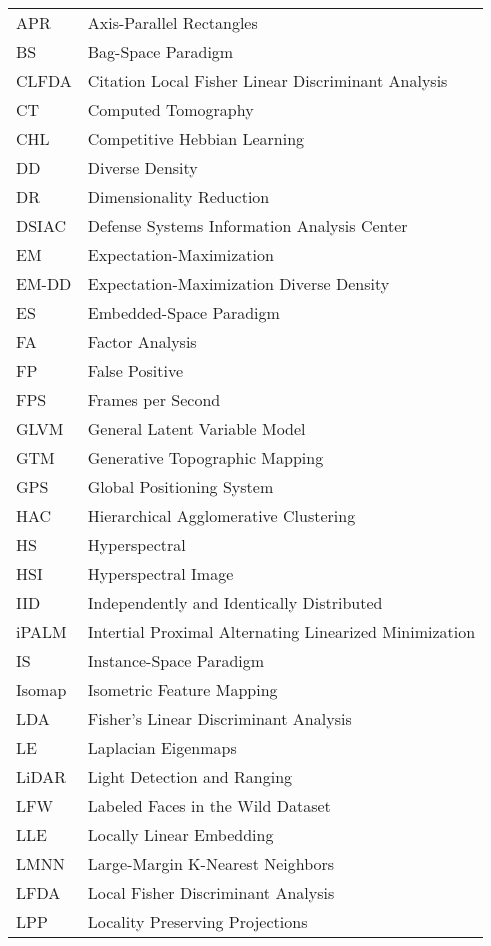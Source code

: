 \begin{longtable}{l p{5in}} %

APR & Axis-Parallel Rectangles\\
BS & Bag-Space Paradigm\\
CLFDA &  Citation Local Fisher Linear Discriminant Analysis\\
CT & Computed Tomography\\
CHL & Competitive Hebbian Learning\\
DD & Diverse Density\\
DR & Dimensionality Reduction\\
DSIAC & Defense Systems Information Analysis Center\\
EM & Expectation-Maximization\\
EM-DD & Expectation-Maximization Diverse Density\\
ES & Embedded-Space Paradigm\\
FA & Factor Analysis\\
FP & False Positive\\ 
FPS & Frames per Second\\
GLVM & General Latent Variable Model\\
GTM & Generative Topographic Mapping\\
GPS & Global Positioning System\\
HAC & Hierarchical Agglomerative Clustering\\
HS & Hyperspectral\\
HSI & Hyperspectral Image\\
IID & Independently and Identically Distributed\\
iPALM & Intertial Proximal Alternating Linearized Minimization\\
IS & Instance-Space Paradigm\\
Isomap & Isometric Feature Mapping\\
LDA & Fisher's Linear Discriminant Analysis\\
LE & Laplacian Eigenmaps\\
LiDAR & Light Detection and Ranging\\
LFW & Labeled Faces in the Wild Dataset\\
LLE & Locally Linear Embedding\\
LMNN & Large-Margin K-Nearest Neighbors\\
LFDA & Local Fisher Discriminant Analysis\\
LPP & Locality Preserving Projections\\

\end{longtable}
